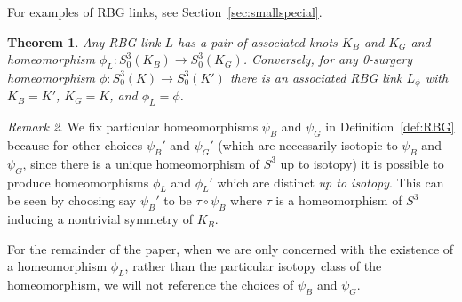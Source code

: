 \documentclass [11pt]{amsart}
\newtheorem {theorem}{Theorem}[section]
\theoremstyle{remark}
\newtheorem {remark}[theorem]{Remark}
\begin{document}
For examples of RBG links, see Section~\ref{sec:smallspecial}. 




{
\renewcommand{\thetheorem}{\ref{thm:RBG}}
\begin{theorem}
Any RBG link $L$ has a pair of associated knots $K_B$ and $K_G$ and homeomorphism $\phi_L:S^3_0(K_B)\to S^3_0(K_G)$. Conversely, for any 0-surgery homeomorphism $\phi:S^3_0(K)\to S^3_0(K')$ there is an associated RBG link $L_\phi$ with $K_B=K'$, $K_G=K$, and $\phi_L = \phi$. 
\end{theorem}
\addtocounter{theorem}{-1}
}

\begin{remark}
We fix particular homeomorphisms $\psi_B$ and $\psi_G$ in Definition~\ref{def:RBG} because for other  choices $\psi_B'$ and $\psi_G'$ (which are necessarily isotopic to $\psi_B$ and $\psi_G$, since there is a unique homeomorphism of $S^3$ up to isotopy) it is possible to produce homeomorphisms $\phi_L$ and $\phi_L'$ which are distinct \emph{up to isotopy}. This can be seen by choosing say $\psi_B'$ to be $\tau\circ\psi_B$ where $\tau$ is a homeomorphism of $S^3$ inducing a nontrivial symmetry of $K_B$.  

For the remainder of the paper, when we are only concerned with the existence of a homeomorphism $\phi_L$, rather than the particular isotopy class of the homeomorphism,  we will not reference the choices of $\psi_B$ and $\psi_G$.  
\end{remark}
\end{document}
